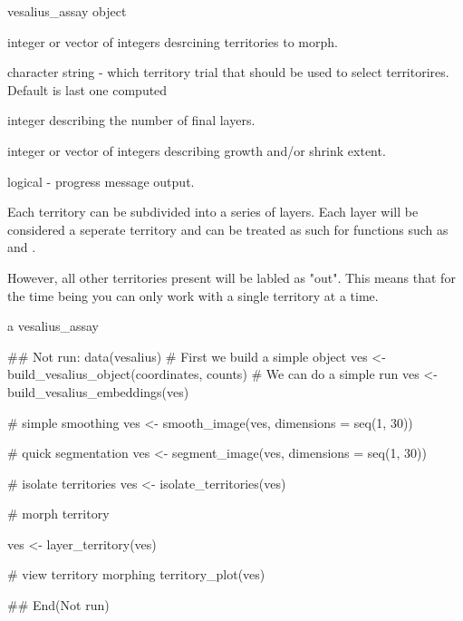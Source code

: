 \documentclass[a4paper]{book}
\begin{document}
\begin{Arguments}
\begin{ldescription}
\item[\code{vesalius\_assay}] vesalius\_assay object

\item[\code{territory}] integer or vector of integers desrcining territories 
to morph.

\item[\code{trial}] character string - which territory trial that 
should be used to select
territorires. Default is last one computed

\item[\code{layer\_depth}] integer describing the number of final layers.

\item[\code{morphology\_factor}] integer or vector of integers describing growth
and/or shrink extent.

\item[\code{verbose}] logical - progress message output.
\end{ldescription}
\end{Arguments}
%
\begin{Details}
Each territory can be subdivided into a series of layers. 
Each layer will be considered a seperate territory and can be treated as
such for functions such as  and 
.

However, all other territories present will be labled as "out". 
This means that for the time being you can only work with a single
territory at a time.
\end{Details}
%
\begin{Value}
a vesalius\_assay
\end{Value}
%
\begin{Examples}
\begin{ExampleCode}
## Not run: 
data(vesalius)
# First we build a simple object
ves <- build_vesalius_object(coordinates, counts)
# We can do a simple run
ves <- build_vesalius_embeddings(ves)

# simple smoothing
ves <- smooth_image(ves, dimensions = seq(1, 30))

# quick segmentation
ves <- segment_image(ves, dimensions = seq(1, 30))

# isolate territories
ves <- isolate_territories(ves)

# morph territory

ves <- layer_territory(ves)

# view territory morphing
territory_plot(ves)

## End(Not run)
\end{ExampleCode}
\end{Examples}
\end{document}
